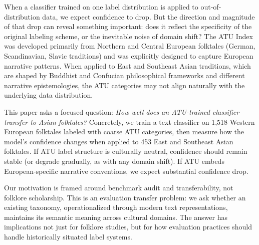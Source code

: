 \documentclass{article}
\begin{document}
When a classifier trained on one label distribution is applied to out-of-distribution data, we expect confidence to drop. But the direction and magnitude of that drop can reveal something important: does it reflect the specificity of the original labeling scheme, or the inevitable noise of domain shift? The ATU Index was developed primarily from Northern and Central European folktales (German, Scandinavian, Slavic traditions) and was explicitly designed to capture European narrative patterns. When applied to East and Southeast Asian traditions, which are shaped by Buddhist and Confucian philosophical frameworks and different narrative epistemologies, the ATU categories may not align naturally with the underlying data distribution.

This paper asks a focused question: \textit{How well does an ATU-trained classifier transfer to Asian folktales?} Concretely, we train a text classifier on 1,518 Western European folktales labeled with coarse ATU categories, then measure how the model's confidence changes when applied to 453 East and Southeast Asian folktales. If ATU label structure is culturally neutral, confidence should remain stable (or degrade gradually, as with any domain shift). If ATU embeds European-specific narrative conventions, we expect substantial confidence drop.

Our motivation is framed around benchmark audit and transferability, not folklore scholarship. This is an evaluation transfer problem: we ask whether an existing taxonomy, operationalized through modern text representations, maintains its semantic meaning across cultural domains. The answer has implications not just for folklore studies, but for how evaluation practices should handle historically situated label systems.
\end{document}
